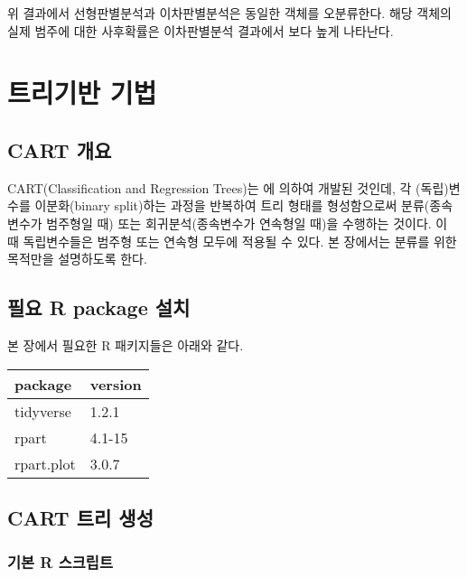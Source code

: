 \documentclass[]{book}
\begin{document}
위 결과에서 선형판별분석과 이차판별분석은 동일한 객체를 오분류한다. 해당 객체의 실제 범주에 대한 사후확률은 이차판별분석 결과에서 보다 높게 나타난다.

\hypertarget{tree-based-method}{%
\chapter{트리기반 기법}\label{tree-based-method}}

\hypertarget{cart-overview}{%
\section{CART 개요}\label{cart-overview}}

CART(Classification and Regression Trees)는 \citet{breiman1984classification} 에 의하여 개발된 것인데, 각 (독립)변수를 이분화(binary split)하는 과정을 반복하여 트리 형태를 형성함으로써 분류(종속변수가 범주형일 때) 또는 회귀분석(종속변수가 연속형일 때)을 수행하는 것이다. 이 때 독립변수들은 범주형 또는 연속형 모두에 적용될 수 있다. 본 장에서는 분류를 위한 목적만을 설명하도록 한다.

\hypertarget{cart-packages-install}{%
\section{필요 R package 설치}\label{cart-packages-install}}

본 장에서 필요한 R 패키지들은 아래와 같다.

\begin{tabular}{l|l}
\hline
package & version\\
\hline
tidyverse & 1.2.1\\
\hline
rpart & 4.1-15\\
\hline
rpart.plot & 3.0.7\\
\hline
\end{tabular}

\hypertarget{cart-build}{%
\section{CART 트리 생성}\label{cart-build}}

\hypertarget{cart-basic-r-script}{%
\subsection{기본 R 스크립트}\label{cart-basic-r-script}}
\end{document}
